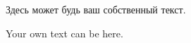 \documentclass[12pt,a4paper]{article} %
\begin{document}

Здесь может будь ваш собственный текст.

Your own text can be here.
\end{document}
